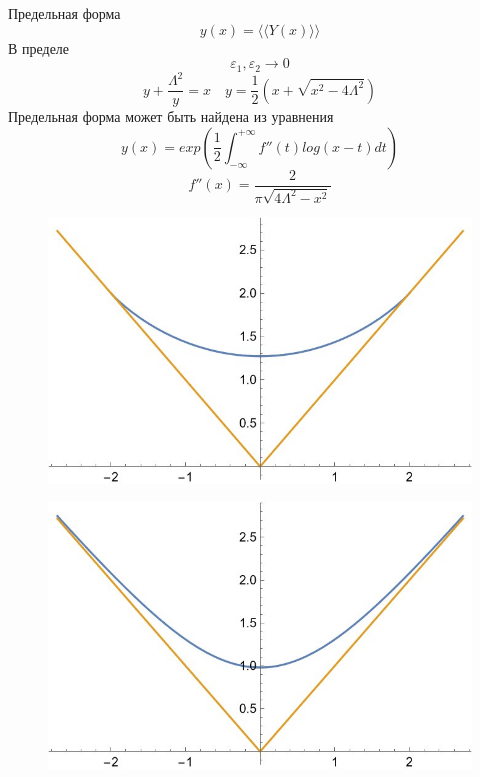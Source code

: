 \documentclass[fullscreen=true, bookmarks=false]{beamer}
\begin{document}
\begin{frame}
{Предельная форма}
\begin{equation}
    y(x) = \langle \langle Y(x) \rangle \rangle
\end{equation}
В пределе 
\begin{equation}
    \varepsilon_1, \varepsilon_2 \rightarrow 0
\end{equation}
\begin{equation}
    y + \frac{\Lambda^2}{y} = x  \quad y = \frac{1}{2}(x + \sqrt{x^2 - 4\Lambda^2})
\end{equation}
Предельная форма может быть найдена из уравнения 
\begin{equation}
    y(x) = exp(\frac{1}{2} \int_{-\infty}^{+\infty} f''(t)log(x - t)dt)
\end{equation}
\begin{equation}
    f''(x) = \frac{2}{\pi\sqrt{4\Lambda^2 - x^2}}
\end{equation}
\end{frame}
\begin{frame}
\begin{figure}
\includegraphics[width=0.55\linewidth]{young_diagram_5.jpg}\\
\end{figure}
\begin{figure}
\includegraphics[width=0.55\linewidth]{young_diagram_7.jpg}\\
\end{figure}
\end{frame}
\end{document}
